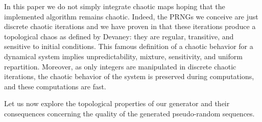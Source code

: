 In this paper we do not simply integrate chaotic maps hoping that the implemented algorithm remains chaotic. Indeed, the PRNGs we conceive are just discrete chaotic iterations and we have proven in \cite{guyeux09} that these iterations produce a topological chaos as defined by Devaney: they are regular, transitive, and sensitive to initial conditions. This famous definition of a chaotic behavior for a dynamical system implies unpredictability, mixture, sensitivity, and uniform repartition. Moreover, as only integers are manipulated in discrete chaotic iterations, the chaotic behavior of the system is preserved during computations, and these computations are fast.

Let us now explore the topological properties of our generator and their consequences concerning the quality of the generated pseudo-random sequences.



